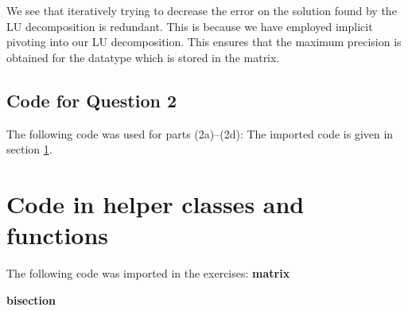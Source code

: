 \documentclass{article}
\newcommand{\CodeDir}{Code}
\begin{document}
We see that iteratively trying to decrease the error on the solution found by the LU decomposition is redundant. 
This is because we have employed implicit pivoting into our LU decomposition. This ensures that the maximum precision is obtained for
the datatype which is stored in the matrix. 



\subsection{Code for Question 2}
The following code was used for parts (2a)--(2d):
The imported code is given in  section \ref{appendix_section}.



\section{Code in helper classes and functions}
\label{appendix_section}
The following code was imported in the exercises:
\textbf{matrix}

\textbf{bisection}

\end{document}
